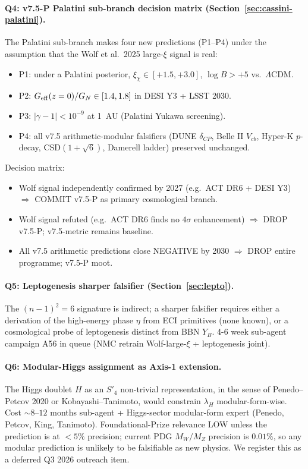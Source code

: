 \documentclass[a4paper,11pt]{article}
\newcommand{\Spf}{S'_4}
\theoremstyle{definition}
\theoremstyle{remark}
\begin{document}
\paragraph{Q4: v7.5-P Palatini sub-branch decision matrix
(Section~\ref{sec:cassini-palatini}).}  The Palatini
sub-branch makes four new predictions (P1--P4) under the
assumption that the Wolf et al.\ 2025 large-$\xi$ signal
\cite{Wolf25} is real:
\begin{itemize}
  \item P1: under a Palatini posterior, $\xi_\chi\in[+1.5,+3.0]$,
    $\log B>+5$ vs.\ $\Lambda$CDM.
  \item P2: $G_{\rm eff}(z=0)/G_{N}\in[1.4,1.8]$ in DESI Y3 +
    LSST 2030.
  \item P3: $|\gamma-1|<10^{-9}$ at 1~AU (Palatini Yukawa
    screening).
  \item P4: all v7.5 arithmetic-modular falsifiers
    (DUNE $\delta_{CP}$, Belle II $V_{cb}$, Hyper-K $p$-decay,
    CSD$(1+\sqrt 6)$, Damerell ladder) preserved unchanged.
\end{itemize}
\noindent
Decision matrix:
\begin{itemize}
  \item Wolf signal independently confirmed by 2027 (e.g.\ ACT
    DR6 + DESI Y3) $\Rightarrow$ COMMIT v7.5-P as primary
    cosmological branch.
  \item Wolf signal refuted (e.g.\ ACT DR6 finds no
    $4\sigma$ enhancement) $\Rightarrow$ DROP v7.5-P; v7.5-metric
    remains baseline.
  \item All v7.5 arithmetic predictions close NEGATIVE by 2030
    $\Rightarrow$ DROP entire programme; v7.5-P moot.
\end{itemize}

\paragraph{Q5: Leptogenesis sharper falsifier
(Section~\ref{sec:lepto}).}  The $(n-1)^2=6$ signature is
indirect; a sharper falsifier requires either a derivation of
the high-energy phase $\eta$ from ECI primitives (none known),
or a cosmological probe of leptogenesis distinct from BBN
$Y_B$.  4-6 week sub-agent campaign A56 in queue
(NMC retrain Wolf-large-$\xi$ + leptogenesis joint).

\paragraph{Q6: Modular-Higgs assignment as Axis-1 extension.}
The Higgs doublet $H$ as an $\Spf$ non-trivial
representation, in the sense of Penedo--Petcov 2020 \cite{NPP20}
or Kobayashi--Tanimoto, would constrain $\lambda_H$
modular-form-wise.  Cost $\sim 8$--$12$ months sub-agent +
Higgs-sector modular-form expert (Penedo, Petcov, King,
Tanimoto).  Foundational-Prize relevance LOW unless the
prediction is at $<5\%$ precision; current PDG $M_W/M_Z$
precision is $0.01\%$, so any modular prediction is unlikely
to be falsifiable as new physics.  We register this as a
deferred Q3 2026 outreach item.
\end{document}
